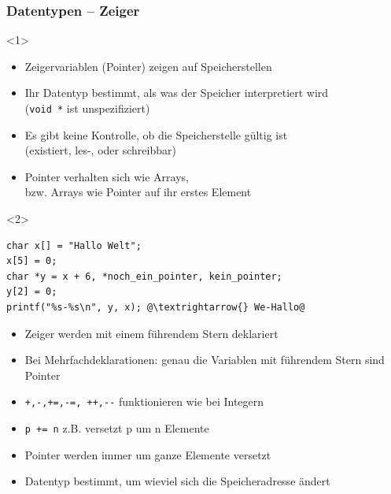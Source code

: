 \documentclass{slides}
\begin{document}
\begin{frame}[fragile]
  \frametitle{Datentypen -- Zeiger}

  \begin{onlyenv}<1>
    \vfill
    \centering
    \vfill

    \begin{itemize}
    \item Zeigervariablen (Pointer) zeigen auf Speicherstellen
    \item Ihr Datentyp bestimmt, als was der Speicher interpretiert wird\\
      (\lstinline!void *! ist unspezifiziert)
    \item Es gibt keine Kontrolle, ob die Speicherstelle gültig ist\\
      (existiert, les-, oder schreibbar)
    \item Pointer verhalten sich wie Arrays,\\
      bzw. Arrays wie Pointer auf ihr erstes Element
    \end{itemize}
  \end{onlyenv}

  \begin{onlyenv}<2>
\begin{lstlisting}
char x[] = "Hallo Welt";
x[5] = 0;
char *y = x + 6, *noch_ein_pointer, kein_pointer;
y[2] = 0;
printf("%s-%s\n", y, x); @\textrightarrow{} We-Hallo@
\end{lstlisting}

    \begin{itemize}
    \item Zeiger werden mit einem führendem Stern deklariert
    \item Bei Mehrfachdeklarationen: genau die Variablen mit führendem Stern sind Pointer
    \item \lstinline!+,-,+=,-=, ++,--! funktionieren wie bei Integern
    \item \lstinline!p += n! z.B. versetzt p um n Elemente
    \item Pointer werden immer um ganze Elemente versetzt
    \item Datentyp bestimmt, um wieviel
      sich die Speicheradresse ändert
    \end{itemize}
  \end{onlyenv}
\end{frame}
\end{document}
